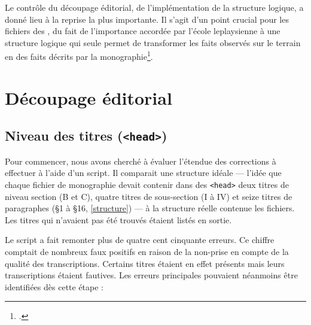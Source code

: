 Le contrôle du découpage éditorial, \cad{} de l'implémentation de la structure logique, a donné lieu à la reprise la plus importante. Il s'agit d'un point crucial pour les fichiers des \odm, du fait de l'importance accordée par l'école leplaysienne à une structure logique qui seule permet de transformer les \og faits observés \fg{} sur le terrain en des \og faits décrits \fg{} par la monographie\footcite[p. 87]{baciocchi2}.

\section{Découpage éditorial}

\subsection{Niveau des titres (\texttt{<head>})}

Pour commencer, nous avons cherché à évaluer l'étendue des corrections à effectuer à l'aide d'un script. Il comparait une structure idéale --- \cad{} l'idée que chaque fichier de monographie devait contenir dans des \texttt{<head>} deux titres de niveau section (B et C), quatre titres de sous-section (I à IV) et seize titres de paragraphes (§1 à §16, \cf{} \ann{} \ref{structure}) --- à la structure réelle contenue les fichiers. Les titres qui n'avaient pas été trouvés étaient listés en sortie.

Le script a fait remonter plus de quatre cent cinquante erreurs. Ce chiffre comptait de nombreux faux positifs en raison de la non-prise en compte de la qualité des transcriptions. Certains titres étaient en effet présents mais leurs transcriptions étaient fautives. Les erreurs principales pouvaient néanmoins être identifiées dès cette étape :

